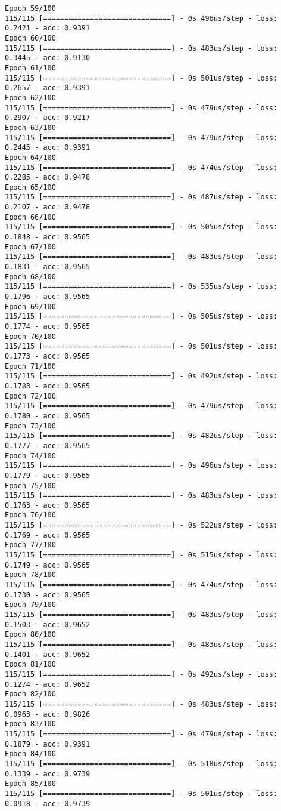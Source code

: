 \documentclass[11pt]{article}
\begin{document}
\begin{Verbatim}[commandchars=\\\{\}]
Epoch 59/100
115/115 [==============================] - 0s 496us/step - loss: 0.2421 - acc: 0.9391
Epoch 60/100
115/115 [==============================] - 0s 483us/step - loss: 0.3445 - acc: 0.9130
Epoch 61/100
115/115 [==============================] - 0s 501us/step - loss: 0.2657 - acc: 0.9391
Epoch 62/100
115/115 [==============================] - 0s 479us/step - loss: 0.2907 - acc: 0.9217
Epoch 63/100
115/115 [==============================] - 0s 479us/step - loss: 0.2445 - acc: 0.9391
Epoch 64/100
115/115 [==============================] - 0s 474us/step - loss: 0.2285 - acc: 0.9478
Epoch 65/100
115/115 [==============================] - 0s 487us/step - loss: 0.2107 - acc: 0.9478
Epoch 66/100
115/115 [==============================] - 0s 505us/step - loss: 0.1848 - acc: 0.9565
Epoch 67/100
115/115 [==============================] - 0s 483us/step - loss: 0.1831 - acc: 0.9565
Epoch 68/100
115/115 [==============================] - 0s 535us/step - loss: 0.1796 - acc: 0.9565
Epoch 69/100
115/115 [==============================] - 0s 505us/step - loss: 0.1774 - acc: 0.9565
Epoch 70/100
115/115 [==============================] - 0s 501us/step - loss: 0.1773 - acc: 0.9565
Epoch 71/100
115/115 [==============================] - 0s 492us/step - loss: 0.1783 - acc: 0.9565
Epoch 72/100
115/115 [==============================] - 0s 479us/step - loss: 0.1780 - acc: 0.9565
Epoch 73/100
115/115 [==============================] - 0s 482us/step - loss: 0.1777 - acc: 0.9565
Epoch 74/100
115/115 [==============================] - 0s 496us/step - loss: 0.1779 - acc: 0.9565
Epoch 75/100
115/115 [==============================] - 0s 483us/step - loss: 0.1763 - acc: 0.9565
Epoch 76/100
115/115 [==============================] - 0s 522us/step - loss: 0.1769 - acc: 0.9565
Epoch 77/100
115/115 [==============================] - 0s 515us/step - loss: 0.1749 - acc: 0.9565
Epoch 78/100
115/115 [==============================] - 0s 474us/step - loss: 0.1730 - acc: 0.9565
Epoch 79/100
115/115 [==============================] - 0s 483us/step - loss: 0.1503 - acc: 0.9652
Epoch 80/100
115/115 [==============================] - 0s 483us/step - loss: 0.1401 - acc: 0.9652
Epoch 81/100
115/115 [==============================] - 0s 492us/step - loss: 0.1274 - acc: 0.9652
Epoch 82/100
115/115 [==============================] - 0s 483us/step - loss: 0.0963 - acc: 0.9826
Epoch 83/100
115/115 [==============================] - 0s 479us/step - loss: 0.1879 - acc: 0.9391
Epoch 84/100
115/115 [==============================] - 0s 518us/step - loss: 0.1339 - acc: 0.9739
Epoch 85/100
115/115 [==============================] - 0s 501us/step - loss: 0.0918 - acc: 0.9739

\end{Verbatim}
\end{document}

